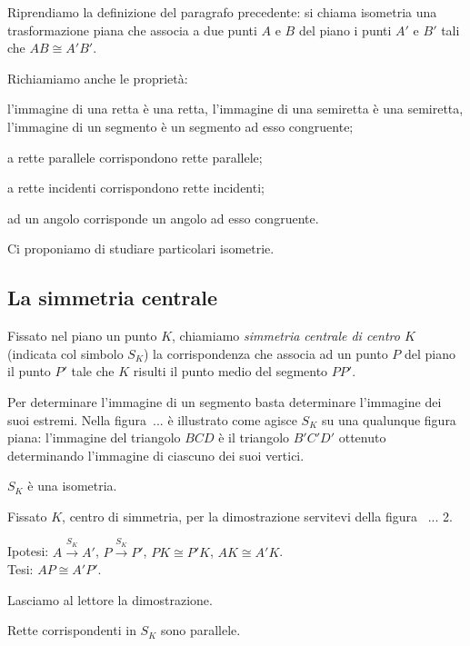 Riprendiamo la definizione del paragrafo precedente: si chiama isometria una trasformazione piana che associa a due punti $A$ e $B$ del piano i punti $A'$ e $B'$ tali che $AB\cong A'B'$.

Richiamiamo anche le proprietà:
\begin{itemize*}
\item l'immagine di una retta è una retta, l'immagine di una semiretta è una semiretta, l'immagine di un segmento è un segmento ad esso congruente;
\item a rette parallele corrispondono rette parallele;
\item a rette incidenti corrispondono rette incidenti;
\item ad un angolo corrisponde un angolo ad esso congruente.
\end{itemize*}

Ci proponiamo di studiare particolari isometrie.

\subsection{La simmetria centrale}

\begin{definizione}
Fissato nel piano un punto $K$, chiamiamo \emph{simmetria centrale di centro $K$} (indicata col simbolo $S_K$) la  corrispondenza che associa ad un punto $P$ del piano il punto $P'$ tale che $K$ risulti il punto medio del segmento $PP'$.
\end{definizione}

Per determinare l'immagine di un segmento basta determinare l'immagine dei suoi estremi. Nella figura~... è illustrato come agisce $S_K$ su una qualunque figura piana: l'immagine del triangolo $BCD$ è il triangolo $B'C'D'$ ottenuto determinando l'immagine di ciascuno dei suoi vertici.

\begin{teorema}\label{teo:8.1}
$S_K$ è una isometria.
\end{teorema}

Fissato $K$, centro di simmetria, per la dimostrazione servitevi della figura~ ... 2.

\noindent Ipotesi: $A\overset{S_K}{\rightarrow}A'$, $P\overset{S_K}{\rightarrow}P'$, $PK\cong P'K$, $AK\cong A'K$.\\
Tesi: $AP\cong A'P'$.

Lasciamo al lettore la dimostrazione.

\begin{teorema}\label{teo:8.2}
Rette corrispondenti in $S_K$ sono parallele.
\end{teorema}

